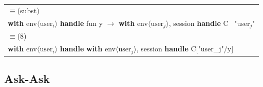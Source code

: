 \documentclass[logo,bsc,singlespacing,parskip]{infthesis}
\begin{document}
\begin{longtable}{@{}l@{}}
\quad$\equiv$\quad (subst) \\
\textbf{with } env$\langle \text{user}_i \rangle$ \textbf{handle } fun y $\rightarrow$ \textbf{with } env$\langle \text{user}_j \rangle$, session \textbf{handle } C \ "user$_j$" \\

\quad$\equiv$\quad (8) \\
\textbf{with } env$\langle \text{user}_i \rangle$ \textbf{handle } \textbf{with } env$\langle \text{user}_j \rangle$, session \textbf{handle } C["user_j"/y] \\
\end{longtable}



\subsection{Ask-Ask}
\end{document}
